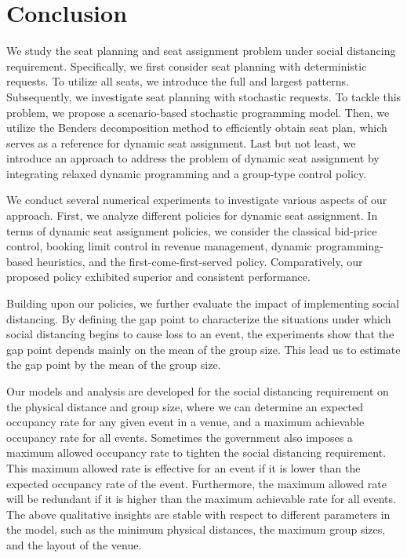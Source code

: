 \section{Conclusion}\label{sec_conclusion}
We study the seat planning and seat assignment problem under social distancing requirement. 
Specifically, we first consider seat planning with deterministic requests. To utilize all seats, we introduce the full and largest patterns. Subsequently, we investigate seat planning with stochastic requests. To tackle this problem, we propose a scenario-based stochastic programming model.
Then, we utilize the Benders decomposition method to efficiently obtain seat plan, which serves as a reference for dynamic seat assignment. Last but not least, we introduce an approach to address the problem of dynamic seat assignment by integrating relaxed dynamic programming and a group-type control policy. 

We conduct several numerical experiments to investigate various aspects of our approach. First, we analyze different policies for dynamic seat assignment. In terms of dynamic seat assignment policies, we consider the classical bid-price control, booking limit control in revenue management, dynamic programming-based heuristics, and the first-come-first-served policy. Comparatively, our proposed policy exhibited superior and consistent performance.

Building upon our policies, we further evaluate the impact of implementing social distancing. By defining the gap point to characterize the situations under which social distancing begins to cause loss to an event, the experiments show that the gap point depends mainly on the mean of the group size.
This lead us to estimate the gap point by the mean of the group size.

Our models and analysis are developed for the social distancing requirement on the physical distance and group size, where we can determine an expected occupancy rate for any given event in a venue, and a maximum achievable occupancy rate for all events. Sometimes the government also imposes a maximum allowed occupancy rate to tighten the social distancing requirement. This maximum allowed rate is effective for an event if it is lower than the expected occupancy rate of the event. Furthermore,
the maximum allowed rate will be redundant if it is higher than the maximum achievable rate for all
events. The above qualitative insights are stable with respect to different parameters in the model, such as the minimum physical distances, the maximum group sizes, and the layout of the venue.



